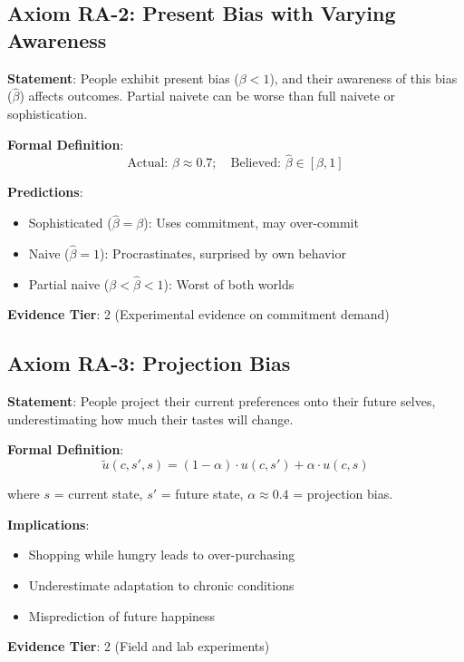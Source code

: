 \subsection{Axiom RA-2: Present Bias with Varying Awareness}

\begin{tcolorbox}[colback=blue!5!white,colframe=blue!75!black,title=Axiom RA-2: Present Bias and Self-Awareness]
\textbf{Statement}: People exhibit present bias ($\beta < 1$), and their awareness of this bias ($\hat{\beta}$) affects outcomes. Partial naivete can be worse than full naivete or sophistication.

\textbf{Formal Definition}:
\begin{equation}
\text{Actual: } \beta \approx 0.7; \quad \text{Believed: } \hat{\beta} \in [\beta, 1]
\end{equation}

\textbf{Predictions}:
\begin{itemize}
    \item Sophisticated ($\hat{\beta} = \beta$): Uses commitment, may over-commit
    \item Naive ($\hat{\beta} = 1$): Procrastinates, surprised by own behavior
    \item Partial naive ($\beta < \hat{\beta} < 1$): Worst of both worlds
\end{itemize}

\textbf{Evidence Tier}: 2 (Experimental evidence on commitment demand)
\end{tcolorbox}

\subsection{Axiom RA-3: Projection Bias}

\begin{tcolorbox}[colback=blue!5!white,colframe=blue!75!black,title=Axiom RA-3: Projection Bias]
\textbf{Statement}: People project their current preferences onto their future selves, underestimating how much their tastes will change.

\textbf{Formal Definition}:
\begin{equation}
\tilde{u}(c, s', s) = (1-\alpha) \cdot u(c, s') + \alpha \cdot u(c, s)
\end{equation}

where $s$ = current state, $s'$ = future state, $\alpha \approx 0.4$ = projection bias.

\textbf{Implications}:
\begin{itemize}
    \item Shopping while hungry leads to over-purchasing
    \item Underestimate adaptation to chronic conditions
    \item Misprediction of future happiness
\end{itemize}

\textbf{Evidence Tier}: 2 (Field and lab experiments)
\end{tcolorbox}

